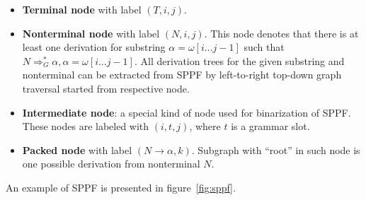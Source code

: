 \begin{itemize}
    \item \textbf{Terminal node} with label $(T, i, j)$.
    \item \textbf{Nonterminal node} with label $(N, i, j)$. 
    This node denotes that there is at least one derivation for substring $\alpha=\omega[i \dots j-1]$ such that $N \Rightarrow^*_G \alpha, \alpha = \omega[i \dots j-1] $.
    All derivation trees for the given substring and nonterminal can be extracted from SPPF by left-to-right top-down graph traversal started from respective node.     
    \item \textbf{Intermediate node}: a special kind of node used for binarization of SPPF. These nodes are labeled with $(i,t,j)$, where $t$ is a grammar slot.
    \item \textbf{Packed node} with label $(N \rightarrow \alpha, k)$. 
    Subgraph with ``root'' in such node is one possible derivation from nonterminal $N$.

\end{itemize}

An example of SPPF is presented in figure~\ref{fig:sppf}.
